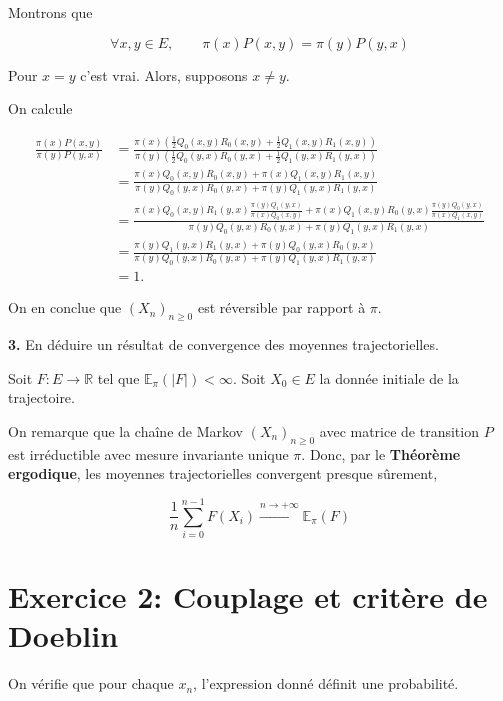 \documentclass[french]{article}
\begin{document}
	Montrons que
	
	$$\forall x,y \in E, \qquad \pi(x)P(x,y) = \pi(y)P(y,x)$$
	
	Pour $x=y$ c'est vrai. Alors, supposons $x \not= y$.
	
	On calcule
	
	\begin{align}
	\frac{\pi(x)P(x,y)}{\pi(y)P(y,x)} &= \frac{\pi(x)\left(\frac{1}{2}Q_0(x,y)R_0(x,y) + \frac{1}{2}Q_1(x,y)R_1(x,y)\right)}{\pi(y)\left(\frac{1}{2}Q_0(y,x)R_0(y,x) + \frac{1}{2}Q_1(y,x)R_1(y,x)\right)} \\
	&= \frac{\pi(x)Q_0(x,y)R_0(x,y) + \pi(x)Q_1(x,y)R_1(x,y)}{\pi(y)Q_0(y,x)R_0(y,x) + \pi(y)Q_1(y,x)R_1(y,x)}\\
	&= \frac{\pi(x)Q_0(x,y)R_1(y,x)\frac{\pi(y) Q_1(y,x)}{\pi(x) Q_0(x, y)} + \pi(x)Q_1(x,y)R_0(y,x)\frac{\pi(y) Q_0(y,x)}{\pi(x) Q_1(x, y)}}{\pi(y)Q_0(y,x)R_0(y,x) + \pi(y)Q_1(y,x)R_1(y,x)} \\
	&= \frac{\pi(y)Q_1(y,x)R_1(y,x) + \pi(y)Q_0(y,x)R_0(y,x)}{\pi(y)Q_0(y,x)R_0(y,x) + \pi(y)Q_1(y,x)R_1(y,x)}\\
	&= 1.
	\end{align}
	
	On en conclue que $(X_n)_{n \geq 0}$ est réversible par rapport à $\pi$.
	
	\begin{tcolorbox}[colback=gray!5!white,colframe=gray!75!black]
		\textbf{3.} En déduire un résultat de convergence des moyennes trajectorielles.
	\end{tcolorbox}

	Soit $F: E \to \mathbb{R}$ tel que $\mathbb{E}_{\pi}(|F|) < \infty$. Soit $X_0 \in E$ la donnée initiale de la trajectoire.
	
	On remarque que la chaîne de Markov	$(X_n)_{n \geq 0}$ avec matrice de transition $P$ est irréductible avec mesure invariante unique $\pi$. Donc, par le \textbf{Théorème ergodique}, les moyennes  trajectorielles convergent presque sûrement,
	
	$$ \frac{1}{n} \sum_{i=0}^{n-1} F(X_i)  \xrightarrow[]{n \to +\infty} \mathbb{E}_{\pi}(F) $$
	
	
	\section*{Exercice 2: Couplage et critère de Doeblin}
	
	On vérifie que pour chaque $x_n$, l'expression donné définit une probabilité.
	
\end{document}
